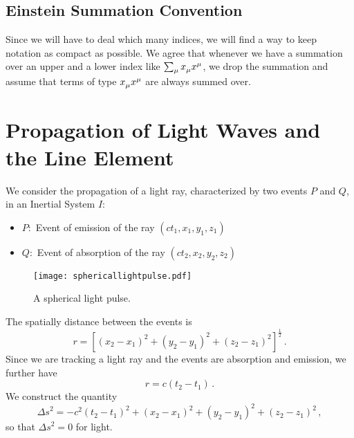 \subsection{Einstein Summation Convention}
Since we will have to deal which many indices, we will find a way to keep
notation as compact as possible. We agree that whenever we have a summation over an
upper and a lower index like $\sum_\mu \tensor{x}{_\mu}\tensor{x}{^\mu}$, we
drop the summation and assume that terms of type
$\tensor{x}{_\mu}\tensor{x}{^\mu}$ are always summed over.
\section{Propagation of Light Waves and the Line Element}
We consider the propagation of a light ray, characterized by two events $P$ and
$Q$, in an Inertial System $I$:
\begin{itemize}
    \item $P:$ Event of emission of the ray $(ct_1,x_1,y_1,z_1)$
    \item $Q:$ Event of absorption of the ray $(ct_2,x_2,y_2,z_2)$
\end{itemize}
\begin{figure}[hbtp!]
\centering
 \texttt{[image: sphericallightpulse.pdf]}
\caption{A spherical light pulse.}
\end{figure}

The spatially distance between the events is
\begin{equation}
    r=\left[(x_2-x_1)^2+(y_2-y_1)^2+(z_2-z_1)^2\right]^{\frac{1}{2}}\, .
\end{equation}
Since we are tracking a light ray and the events are absorption and emission, we
further have
\begin{equation}
    r=c(t_2-t_1)\, .
\end{equation}
We construct the quantity
\begin{equation}
    {\Delta s}^2=-c^2(t_2-t_1)^2+(x_2-x_1)^2+(y_2-y_1)^2+(z_2-z_1)^2\, ,
\end{equation}
so that ${\Delta s}^2=0$ for light.

